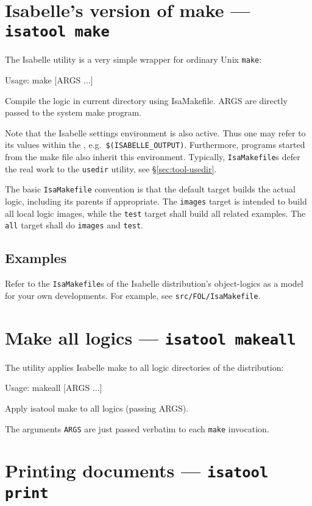\section{Isabelle's version of make --- \texttt{isatool make}}
\label{sec:tool-make}

The Isabelle  utility is a very simple wrapper for
ordinary Unix \texttt{make}:
\begin{ttbox}
Usage: make [ARGS ...]

  Compile the logic in current directory using IsaMakefile.
  ARGS are directly passed to the system make program.
\end{ttbox}
Note that the Isabelle settings environment is also active. Thus one
may refer to its values within the , e.g.\ 
\texttt{\$(ISABELLE_OUTPUT)}. Furthermore, programs started from the
make file also inherit this environment.  Typically,
\texttt{IsaMakefile}s defer the real work to the \texttt{usedir}
utility, see \S\ref{sec:tool-usedir}.

\medskip The basic \texttt{IsaMakefile} convention is that the default
target builds the actual logic, including its parents if appropriate.
The \texttt{images} target is intended to build all local logic
images, while the \texttt{test} target shall build all related
examples.  The \texttt{all} target shall do \texttt{images} and
\texttt{test}.


\subsection*{Examples}

Refer to the \texttt{IsaMakefile}s of the Isabelle distribution's
object-logics as a model for your own developments.  For example, see
\texttt{src/FOL/IsaMakefile}.


\section{Make all logics --- \texttt{isatool makeall}}

The  utility applies Isabelle make to all logic
directories of the distribution:
\begin{ttbox}
Usage: makeall [ARGS ...]

  Apply isatool make to all logics (passing ARGS).
\end{ttbox}
The arguments \texttt{ARGS} are just passed verbatim to each
\texttt{make} invocation.


\section{Printing documents --- \texttt{isatool print}}


